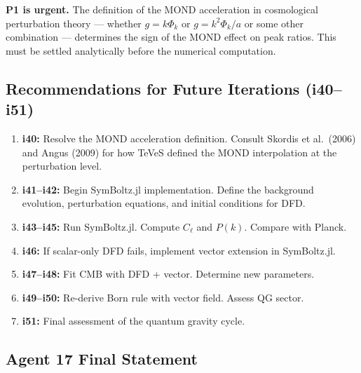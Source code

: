 \documentclass[11pt,a4paper]{article}
\begin{document}
\textbf{P1 is urgent.} The definition of the MOND acceleration in cosmological perturbation theory --- whether $g = k\Phi_k$ or $g = k^2\Phi_k/a$ or some other combination --- determines the sign of the MOND effect on peak ratios. This must be settled analytically before the numerical computation.

\subsection{Recommendations for Future Iterations (i40--i51)}

\begin{enumerate}
\item \textbf{i40:} Resolve the MOND acceleration definition. Consult Skordis et al.\ (2006) and Angus (2009) for how TeVeS defined the MOND interpolation at the perturbation level.

\item \textbf{i41--i42:} Begin SymBoltz.jl implementation. Define the background evolution, perturbation equations, and initial conditions for DFD.

\item \textbf{i43--i45:} Run SymBoltz.jl. Compute $C_\ell$ and $P(k)$. Compare with Planck.

\item \textbf{i46:} If scalar-only DFD fails, implement vector extension in SymBoltz.jl.

\item \textbf{i47--i48:} Fit CMB with DFD + vector. Determine new parameters.

\item \textbf{i49--i50:} Re-derive Born rule with vector field. Assess QG sector.

\item \textbf{i51:} Final assessment of the quantum gravity cycle.
\end{enumerate}

\subsection{Agent 17 Final Statement}
\end{document}
